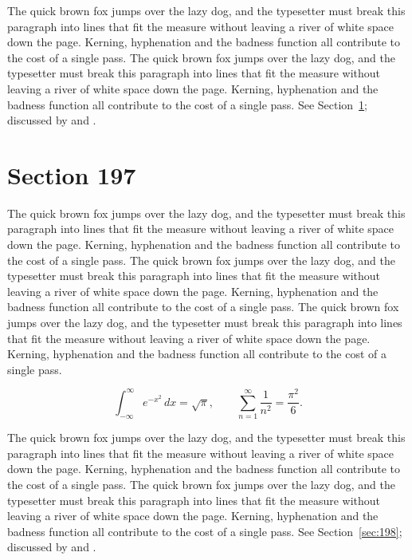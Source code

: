 \documentclass{article}
\begin{document}
The quick brown fox jumps over the lazy dog, and the typesetter must break this paragraph into lines that fit the measure without leaving a river of white space down the page. Kerning, hyphenation and the badness function all contribute to the cost of a single pass. The quick brown fox jumps over the lazy dog, and the typesetter must break this paragraph into lines that fit the measure without leaving a river of white space down the page. Kerning, hyphenation and the badness function all contribute to the cost of a single pass. 
See Section~\ref{sec:197}; discussed by \textcite{k2} and \textcite{l4}.
\section{Section 197}
\label{sec:197}
The quick brown fox jumps over the lazy dog, and the typesetter must break this paragraph into lines that fit the measure without leaving a river of white space down the page. Kerning, hyphenation and the badness function all contribute to the cost of a single pass. The quick brown fox jumps over the lazy dog, and the typesetter must break this paragraph into lines that fit the measure without leaving a river of white space down the page. Kerning, hyphenation and the badness function all contribute to the cost of a single pass. The quick brown fox jumps over the lazy dog, and the typesetter must break this paragraph into lines that fit the measure without leaving a river of white space down the page. Kerning, hyphenation and the badness function all contribute to the cost of a single pass. 

\begin{equation}\label{eq:197}
\int_{-\infty}^{\infty} e^{-x^{2}}\,dx = \sqrt{\pi}, \qquad
\sum_{n=1}^{\infty} \frac{1}{n^{2}} = \frac{\pi^{2}}{6}.
\end{equation}

The quick brown fox jumps over the lazy dog, and the typesetter must break this paragraph into lines that fit the measure without leaving a river of white space down the page. Kerning, hyphenation and the badness function all contribute to the cost of a single pass. The quick brown fox jumps over the lazy dog, and the typesetter must break this paragraph into lines that fit the measure without leaving a river of white space down the page. Kerning, hyphenation and the badness function all contribute to the cost of a single pass. 
See Section~\ref{sec:198}; discussed by \textcite{k3} and \textcite{l5}.
\end{document}
